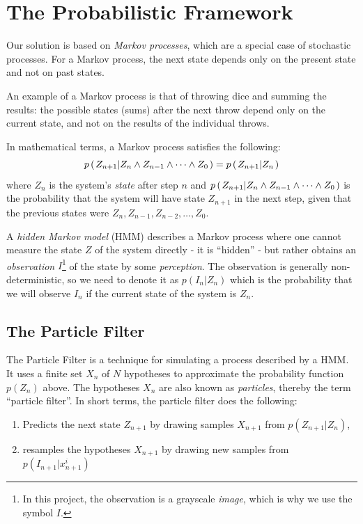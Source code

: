\section*{The Probabilistic Framework}
Our solution is based on \emph{Markov processes}, which are a special case of stochastic processes. For a Markov process, the next state depends only on the present state and not on past states.

An example of a Markov process is that of throwing dice and summing the results: the possible states (sums) after the next throw depend only on the current state, and not on the results of the individual throws.

In mathematical terms, a Markov process satisfies the following:
\begin{equation}
 p\left(\left. Z_{n+1} \middle\vert Z_n \wedge Z_{n-1} \wedge \dots \wedge Z_0 \right.\right) = p\left(\left. Z_{n+1} \middle\vert Z_n \right.\right)
\end{equation}
where $Z_n$ is the system's \emph{state} after step $n$ and $p\left(\left. Z_{n+1} \middle\vert Z_n \wedge Z_{n-1} \wedge \dots \wedge Z_0 \right.\right)$ is the probability that the system will have state $Z_{n+1}$ in the next step, given that the previous states were $Z_n, Z_{n-1}, Z_{n-2}, \dots, Z_0$.

A \emph{hidden Markov model} (HMM) describes a Markov process where one cannot measure the state $Z$ of the system directly - it is ``hidden'' - but rather obtains an \emph{observation} $I$\footnote{In this project, the observation is a grayscale \emph{image}, which is why we use the symbol $I$.}  of the state by some \emph{perception}. The observation is generally non-deterministic, so we need to denote it as $p(I_n|Z_n)$ which is the probability that we will observe $I_n$ if the current state of the system is $Z_n$.

\subsection*{The Particle Filter}
The Particle Filter is a technique for simulating a process described by a HMM. It uses a finite set $X_n$ of $N$ hypotheses to approximate the probability function $p(Z_n)$ above. The hypotheses $X_n$ are also known as \emph{particles}, thereby the term ``particle filter''. In short terms, the particle filter does the following:

\begin{enumerate}
  \item Predicts the next state $Z_{n+1}$ by drawing samples $X_{n+1}$ from $p(Z_{n+1} | Z_n)$,
  \item resamples the hypotheses $X_{n+1}$ by drawing new samples from $p\left(I_{n+1} | x_{n+1}^i\right)$
\end{enumerate}


